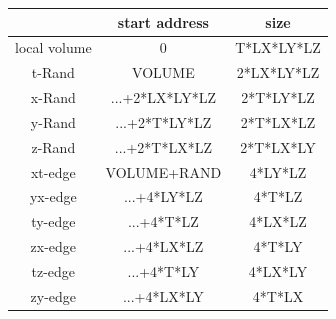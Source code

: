 \begin{table}[t]
  \centering
  \begin{tabular*}{1.\textwidth}{@{\extracolsep{\fill}}ccc}
    \hline\hline
     & start address & size \\
    \hline\hline
    local volume & 0 & T*LX*LY*LZ \\
    \hline
    t-Rand       & VOLUME & 2*LX*LY*LZ \\
    x-Rand       & ...+2*LX*LY*LZ & 2*T*LY*LZ\\
    y-Rand       & ...+2*T*LY*LZ & 2*T*LX*LZ \\
    z-Rand       & ...+2*T*LX*LZ & 2*T*LX*LY  \\
    \hline
    xt-edge      & VOLUME+RAND  & 4*LY*LZ \\
    yx-edge      & ...+4*LY*LZ  & 4*T*LZ \\
    ty-edge      & ...+4*T*LZ   & 4*LX*LZ \\
    zx-edge      & ...+4*LX*LZ  & 4*T*LY\\
    tz-edge      & ...+4*T*LY   & 4*LX*LY\\
    zy-edge      & ...+4*LX*LY  & 4*T*LX\\
    


    \hline\hline
 \end{tabular*}
\end{table}

